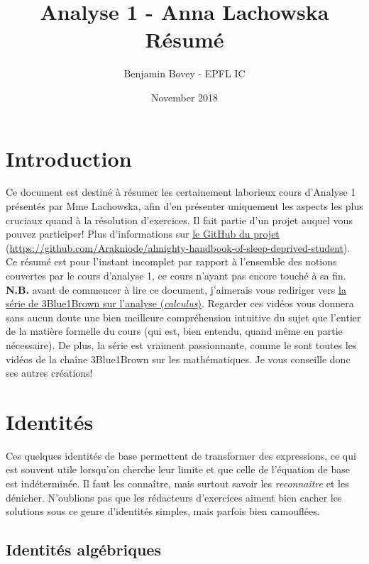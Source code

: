 \documentclass{article}
\title{\vspace{-1.5cm} Analyse 1 -  Anna Lachowska \\ Résumé}
\author{Benjamin Bovey - EPFL IC}
\date{November 2018}
\begin{document}
\maketitle

\section*{Introduction}
Ce document est destiné à résumer les certainement laborieux cours d'Analyse 1 présentés par Mme Lachowska, afin d'en présenter uniquement les aspects les plus cruciaux quand à la résolution d'exercices. Il fait partie d'un projet auquel vous pouvez participer! Plus d'informations sur \href{https://github.com/Arakniode/almighty-handbook-of-sleep-deprived-student}{le GitHub du projet} (\url{https://github.com/Arakniode/almighty-handbook-of-sleep-deprived-student}). \\
Ce résumé est pour l'instant incomplet par rapport à l'ensemble des notions couvertes par le cours d'analyse 1, ce cours n'ayant pas encore touché à sa fin. \\

\textbf{N.B.} avant de commencer à lire ce document, j'aimerais vous rediriger vers \href{https://www.youtube.com/playlist?list=PLZHQObOWTQDMsr9K-rj53DwVRMYO3t5Yr}{la série de 3Blue1Brown sur l'analyse (\emph{calculus})}. Regarder ces vidéos vous donnera sans aucun doute une bien meilleure compréhension intuitive du sujet que l'entier de la matière formelle du cours (qui est, bien entendu, quand même en partie nécessaire). De plus, la série est vraiment passionnante, comme le sont toutes les vidéos de la chaîne 3Blue1Brown sur les mathématiques. Je vous conseille donc ses autres créations!

\section{Identités}
Ces quelques identités de base permettent de transformer des expressions, ce qui est souvent utile lorsqu'on cherche leur limite et que celle de l'équation de base est indéterminée. Il faut les connaître, mais surtout savoir les \emph{reconnaître} et les dénicher. N'oublions pas que les rédacteurs d'exercices aiment bien cacher les solutions sous ce genre d'identités simples, mais parfois bien camouflées.
\subsection{Identités algébriques}
\end{document}
